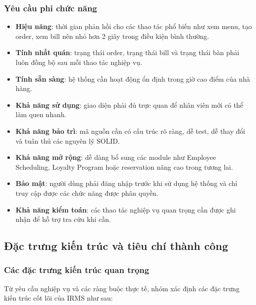 \documentclass[12pt,a4paper]{article}
\begin{document}
\subsubsection{Yêu cầu phi chức năng}

\begin{itemize}
    \item \textbf{Hiệu năng}: thời gian phản hồi cho các thao tác phổ biến như xem menu, tạo order, xem bill nên nhỏ hơn 2 giây trong điều kiện bình thường.
    \item \textbf{Tính nhất quán}: trạng thái order, trạng thái bill và trạng thái bàn phải luôn đồng bộ sau mỗi thao tác nghiệp vụ.
    \item \textbf{Tính sẵn sàng}: hệ thống cần hoạt động ổn định trong giờ cao điểm của nhà hàng.
    \item \textbf{Khả năng sử dụng}: giao diện phải đủ trực quan để nhân viên mới có thể làm quen nhanh.
    \item \textbf{Khả năng bảo trì}: mã nguồn cần có cấu trúc rõ ràng, dễ test, dễ thay đổi và tuân thủ các nguyên lý SOLID.
    \item \textbf{Khả năng mở rộng}: dễ dàng bổ sung các module như Employee Scheduling, Loyalty Program hoặc reservation nâng cao trong tương lai.
    \item \textbf{Bảo mật}: người dùng phải đăng nhập trước khi sử dụng hệ thống và chỉ truy cập được các chức năng được phân quyền.
    \item \textbf{Khả năng kiểm toán}: các thao tác nghiệp vụ quan trọng cần được ghi nhận để hỗ trợ tra cứu khi cần.
\end{itemize}



\subsection{Đặc trưng kiến trúc và tiêu chí thành công}

\subsubsection{Các đặc trưng kiến trúc quan trọng}

Từ yêu cầu nghiệp vụ và các ràng buộc thực tế, nhóm xác định các đặc trưng kiến trúc cốt lõi của IRMS như sau:
\end{document}
